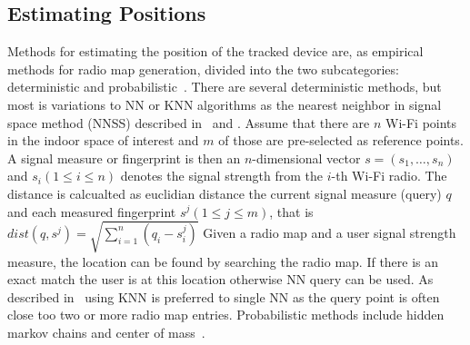 \subsection{Estimating Positions}
Methods for estimating the position of the tracked device are, as empirical methods for radio map generation, divided into the two subcategories: deterministic and probabilistic~\cite{taxonomy2007}.
There are several deterministic methods, but most is variations to NN or KNN algorithms as
the nearest neighbor in signal space method (NNSS)
described in~\cite{6068444} and \cite{radarlf}.
Assume that there are $n$ Wi-Fi points in the indoor space of interest and $m$ of those are pre-selected as reference points. 
A signal measure or fingerprint is then an $n$-dimensional vector $s=(s_{1},\dots,s_{n})$ and $s_{i} (1 \le  i \le n)$ denotes the signal strength from the $i$-th Wi-Fi radio. 
The distance is calcualted as euclidian distance the current signal measure (query) $q$ and each measured fingerprint $s^{j} (1 \le j \le m)$, 
that is $dist(q,s^{j}) = \sqrt{\sum_{i=1}^{n}\left(q_{i}-s^{j}_{i}\right)}$ 
Given a radio map and a user signal strength measure, the location can be found by searching the radio map. 
If there is an exact match the user is at this location otherwise NN query can be used.
As described in~\cite{ariadne2006} using KNN is preferred to single NN as the query point is often close too two or more radio map entries.
Probabilistic methods include hidden markov chains and center of mass~\cite{Youssef2005}.








